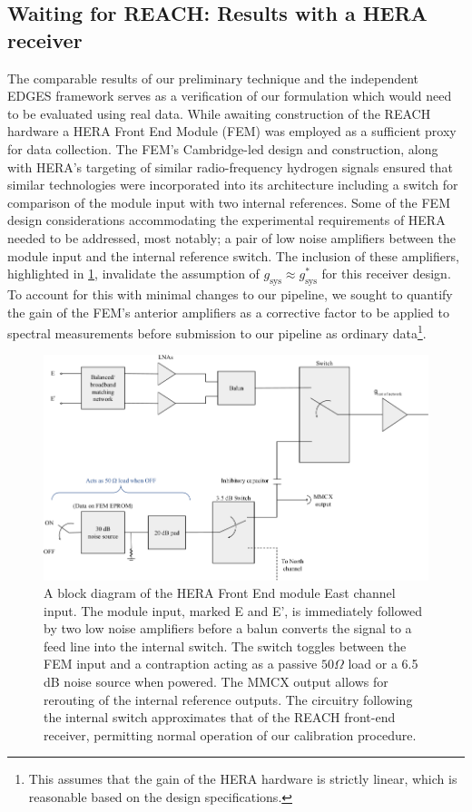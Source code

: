 \subsection{Waiting for REACH: Results with a HERA receiver}\label{sec:hera_results}
The comparable results of our preliminary technique and the independent EDGES framework serves as a verification of our formulation which would need to be evaluated using real data. While awaiting construction of the REACH hardware a HERA Front End Module (FEM) was employed as a sufficient proxy for data collection. The FEM’s Cambridge-led design and construction, along with HERA’s targeting of similar radio-frequency hydrogen signals ensured that similar technologies were incorporated into its architecture including a switch for comparison of the module input with two internal references. Some of the FEM design considerations accommodating the experimental requirements of HERA needed to be addressed, most notably; a pair of low noise amplifiers between the module input and the internal reference switch. The inclusion of these amplifiers, highlighted in \cref{fig:fem_block}, invalidate the assumption of $g_{\mathrm{sys}} \approx g_{\mathrm{sys}}^*$ for this receiver design. To account for this with minimal changes to our pipeline, we sought to quantify the gain of the FEM’s anterior amplifiers as a corrective factor to be applied to spectral measurements before submission to our pipeline as ordinary data\footnote{This assumes that the gain of the HERA hardware is strictly linear, which is reasonable based on the design specifications.}.
\begin{figure}
    \centering
    \includegraphics[width=.8\textwidth]{fem_block}
    \caption{A block diagram of the HERA Front End module East channel input. The module input, marked E and E', is immediately followed by two low noise amplifiers before a balun converts the signal to a feed line into the internal switch. The switch toggles between the FEM input and a contraption acting as a passive $50 \Omega$ load or a 6.5 dB noise source when powered. The MMCX output allows for rerouting of the internal reference outputs. The circuitry following the internal switch approximates that of the REACH front-end receiver, permitting normal operation of our calibration procedure.}
    \label{fig:fem_block}
\end{figure}

